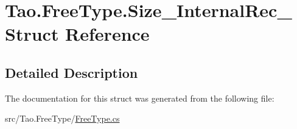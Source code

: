 \hypertarget{struct_tao_1_1_free_type_1_1_size___internal_rec__}{
\section{Tao.FreeType.Size\_\-InternalRec\_\- Struct Reference}
\label{struct_tao_1_1_free_type_1_1_size___internal_rec__}
}


\subsection{Detailed Description}


The documentation for this struct was generated from the following file:\begin{DoxyCompactItemize}
\item 
src/Tao.FreeType/\hyperlink{_free_type_8cs}{FreeType.cs}\end{DoxyCompactItemize}

